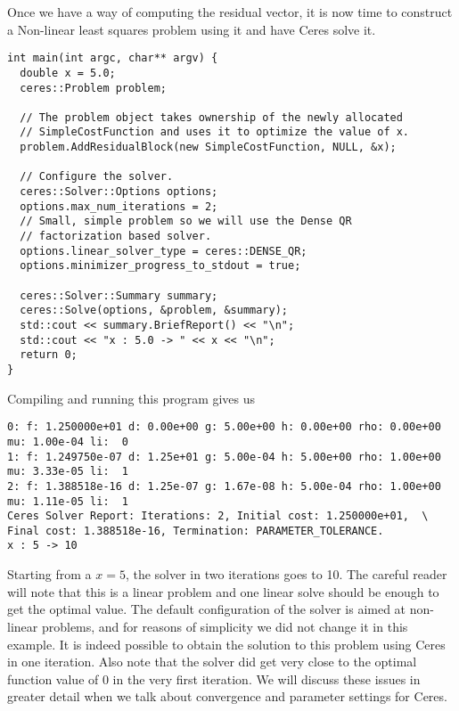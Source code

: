 Once we have a way of computing the residual vector, it is now time to construct a Non-linear least squares problem using it and have Ceres solve it.
\begin{verbatim}
int main(int argc, char** argv) {
  double x = 5.0;
  ceres::Problem problem;

  // The problem object takes ownership of the newly allocated
  // SimpleCostFunction and uses it to optimize the value of x.
  problem.AddResidualBlock(new SimpleCostFunction, NULL, &x);

  // Configure the solver.
  ceres::Solver::Options options;
  options.max_num_iterations = 2;
  // Small, simple problem so we will use the Dense QR
  // factorization based solver.
  options.linear_solver_type = ceres::DENSE_QR;
  options.minimizer_progress_to_stdout = true;

  ceres::Solver::Summary summary;
  ceres::Solve(options, &problem, &summary);
  std::cout << summary.BriefReport() << "\n";
  std::cout << "x : 5.0 -> " << x << "\n";
  return 0;
}
\end{verbatim}

Compiling and running this program gives us
\begin{verbatim}
0: f: 1.250000e+01 d: 0.00e+00 g: 5.00e+00 h: 0.00e+00 rho: 0.00e+00 mu: 1.00e-04 li:  0
1: f: 1.249750e-07 d: 1.25e+01 g: 5.00e-04 h: 5.00e+00 rho: 1.00e+00 mu: 3.33e-05 li:  1
2: f: 1.388518e-16 d: 1.25e-07 g: 1.67e-08 h: 5.00e-04 rho: 1.00e+00 mu: 1.11e-05 li:  1
Ceres Solver Report: Iterations: 2, Initial cost: 1.250000e+01,  \
Final cost: 1.388518e-16, Termination: PARAMETER_TOLERANCE.
x : 5 -> 10
\end{verbatim}

Starting from a $x=5$, the solver in two iterations goes to 10. The careful reader will note that this is a linear problem and one linear solve should be enough to get the optimal value.  The default configuration of the solver is aimed at non-linear problems, and for reasons of simplicity we did not change it in this example. It is indeed possible to obtain the solution to this problem using Ceres in one iteration. Also note that the solver did get very close to the optimal function value of 0 in the very first iteration. We will discuss these issues in greater detail when we talk about convergence and parameter settings for Ceres.
